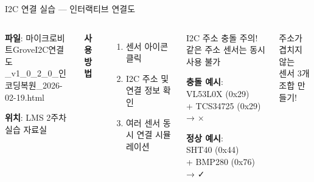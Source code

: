 \documentclass[aspectratio=169]{beamer}
\begin{document}
\begin{frame}{I2C 연결 실습 --- 인터랙티브 연결도}
  \begin{columns}
    \begin{tcolorbox}[title=실습 도구 안내]
      \textbf{파일}: 마이크로비트GroveI2C연결도\\
      \_v1\_0\_2\_0\_인코딩복원\_2026-02-19.html
      
      \vspace{0.3em}
      \textbf{위치}: LMS 2주차 실습 자료실
    \end{tcolorbox}
    
    \vspace{0.5em}
    
    \textbf{사용 방법}
    \begin{enumerate}
      \item 센서 아이콘 클릭
      \item I2C 주소 및 연결 정보 확인
      \item 여러 센서 동시 연결 시뮬레이션
    \end{enumerate}
    
    \begin{alertblock}{I2C 주소 충돌 주의!}
      같은 주소 센서는 동시 사용 불가
      
      \vspace{0.3em}
      \textbf{충돌 예시}:\\
      VL53L0X (0x29)\\
      + TCS34725 (0x29) → {\large $\times$}
      
      \vspace{0.3em}
      \textbf{정상 예시}:\\
      SHT40 (0x44)\\
      + BMP280 (0x76) → {\large ✓}
    \end{alertblock}
    
    \vspace{0.3em}
    
    \begin{tcolorbox}[colframe=accentgreen, title=실습 과제]
      주소가 겹치지 않는\\
      센서 3개 조합 만들기!
    \end{tcolorbox}
  \end{columns}
\end{frame}
\end{document}
